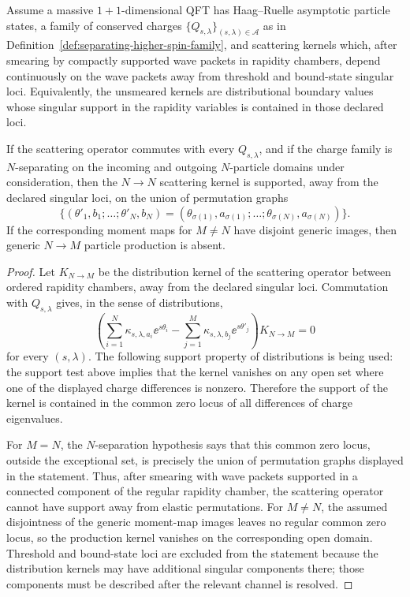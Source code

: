 \begin{proposition}
\label{prop:higher-spin-elastic-support-kinematic}
Assume a massive \(1+1\)-dimensional QFT has Haag--Ruelle asymptotic particle
states, a family of conserved charges
\(\{Q_{s,\lambda}\}_{(s,\lambda)\in\mathcal A}\) as in
Definition~\ref{def:separating-higher-spin-family}, and scattering kernels
which, after smearing by compactly supported wave packets in rapidity
chambers, depend continuously on the wave packets away from threshold and
bound-state singular loci.  Equivalently, the unsmeared kernels are
distributional boundary values whose singular support in the rapidity
variables is contained in those declared loci.

If the scattering operator commutes with every \(Q_{s,\lambda}\), and if the
charge family is \(N\)-separating on the incoming and outgoing \(N\)-particle
domains under consideration, then the \(N\to N\) scattering kernel is
supported, away from the declared singular loci, on the union of permutation
graphs
\[
  \{(\theta'_1,b_1;\ldots;\theta'_N,b_N)
    =
    (\theta_{\sigma(1)},a_{\sigma(1)};\ldots;
     \theta_{\sigma(N)},a_{\sigma(N)})\}.
\]
If the corresponding moment maps for \(M\neq N\) have disjoint generic
images, then generic \(N\to M\) particle production is absent.
\end{proposition}

\begin{proof}
Let \(K_{N\to M}\) be the distribution kernel of the scattering operator
between ordered rapidity chambers, away from the declared singular loci.
Commutation with \(Q_{s,\lambda}\) gives, in the sense of distributions,
\[
  \left(
    \sum_{i=1}^N\kappa_{s,\lambda,a_i}\ee^{s\theta_i}
    -
    \sum_{j=1}^M\kappa_{s,\lambda,b_j}\ee^{s\theta'_j}
  \right)
  K_{N\to M}=0
\]
for every \((s,\lambda)\).  The following support property of distributions
is being used: the support test above implies that
the kernel vanishes on any open set where one of the displayed charge
differences is nonzero.  Therefore the support of the kernel is contained in
the common zero locus of all differences of charge eigenvalues.

For \(M=N\), the \(N\)-separation hypothesis says that this common zero locus,
outside the exceptional set, is precisely the union of permutation graphs
displayed in the statement.  Thus, after smearing with wave packets supported
in a connected component of the regular rapidity chamber, the scattering
operator cannot have support away from elastic permutations.  For \(M\neq N\),
the assumed disjointness of the generic moment-map images leaves no regular
common zero locus, so the production kernel vanishes on the corresponding
open domain.  Threshold and bound-state loci are excluded from the statement
because the distribution kernels may have additional singular components
there; those components must be described after the relevant channel is
resolved.
\end{proof}

